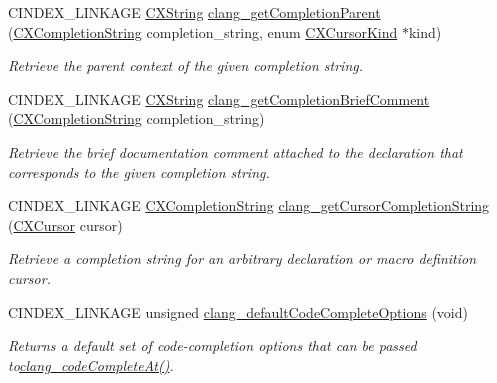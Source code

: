 \begin{DoxyCompactItemize}
C\+I\+N\+D\+E\+X\+\_\+\+L\+I\+N\+K\+A\+GE \hyperlink{structCXString}{C\+X\+String} \hyperlink{group__CINDEX__CODE__COMPLET_ga8afa885ca6547c96baa1369179b3b236}{clang\+\_\+get\+Completion\+Parent} (\hyperlink{group__CINDEX__CODE__COMPLET_gafea23a43a60ec3b4f3bedccfbb76883a}{C\+X\+Completion\+String} completion\+\_\+string, enum \hyperlink{group__CINDEX_gaaccc432245b4cd9f2d470913f9ef0013}{C\+X\+Cursor\+Kind} $\ast$kind)
\begin{DoxyCompactList}\small\item\em Retrieve the parent context of the given completion string. \end{DoxyCompactList}\item 
\mbox{\label{group__CINDEX__CODE__COMPLET_ga32163145c7f0013e5f2ac7176a8ee0ed}} 
C\+I\+N\+D\+E\+X\+\_\+\+L\+I\+N\+K\+A\+GE \hyperlink{structCXString}{C\+X\+String} \hyperlink{group__CINDEX__CODE__COMPLET_ga32163145c7f0013e5f2ac7176a8ee0ed}{clang\+\_\+get\+Completion\+Brief\+Comment} (\hyperlink{group__CINDEX__CODE__COMPLET_gafea23a43a60ec3b4f3bedccfbb76883a}{C\+X\+Completion\+String} completion\+\_\+string)
\begin{DoxyCompactList}\small\item\em Retrieve the brief documentation comment attached to the declaration that corresponds to the given completion string. \end{DoxyCompactList}\item 
C\+I\+N\+D\+E\+X\+\_\+\+L\+I\+N\+K\+A\+GE \hyperlink{group__CINDEX__CODE__COMPLET_gafea23a43a60ec3b4f3bedccfbb76883a}{C\+X\+Completion\+String} \hyperlink{group__CINDEX__CODE__COMPLET_ga403bcb1ebc70f1ec9e19543d76685f43}{clang\+\_\+get\+Cursor\+Completion\+String} (\hyperlink{structCXCursor}{C\+X\+Cursor} cursor)
\begin{DoxyCompactList}\small\item\em Retrieve a completion string for an arbitrary declaration or macro definition cursor. \end{DoxyCompactList}\item 
\mbox{\label{group__CINDEX__CODE__COMPLET_gadb669685b9ef1f8ca62b2a044b846ac1}} 
C\+I\+N\+D\+E\+X\+\_\+\+L\+I\+N\+K\+A\+GE unsigned \hyperlink{group__CINDEX__CODE__COMPLET_gadb669685b9ef1f8ca62b2a044b846ac1}{clang\+\_\+default\+Code\+Complete\+Options} (void)
\begin{DoxyCompactList}\small\item\em Returns a default set of code-\/completion options that can be passed to{\ttfamily \hyperlink{group__CINDEX__CODE__COMPLET_ga50fedfa85d8d1517363952f2e10aa3bf}{clang\+\_\+code\+Complete\+At()}}. \end{DoxyCompactList}\item 

\end{DoxyCompactItemize}
